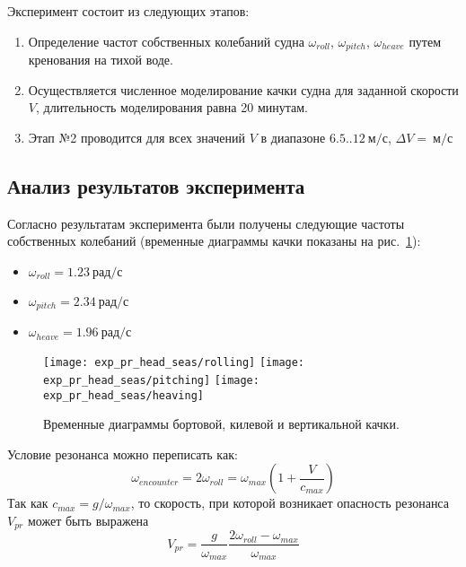Эксперимент состоит из следующих этапов:
\begin{enumerate}
	\item	Определение частот собственных колебаний судна 
			$\omega_{roll}$, $\omega_{pitch}$, $\omega_{heave}$ путем кренования на тихой воде.
	\item	Осуществляется численное моделирование качки судна для заданной скорости $V$, длительность моделирования равна 20 минутам.
	\item	Этап №2	проводится для всех значений $V$ в диапазоне 
			$6.5..12\ \text{м/с}$, $\Delta V=\ \text{м/с}$ 
\end{enumerate}

\subsection{Анализ результатов эксперимента}

Согласно результатам эксперимента были получены следующие частоты собственных колебаний (временные диаграммы качки показаны на рис.~\ref{exp_pr2_rolling}):
\begin{itemize}
	\item	$ \omega_{roll} = 1.23 \ \text{рад/с}$
	\item	$ \omega_{pitch} = 2.34 \ \text{рад/с}$
	\item	$ \omega_{heave} = 1.96 \ \text{рад/с}$
\end{itemize}

\begin{figure}[ht]
	\begin{center}
	\texttt{[image: exp\_pr\_head\_seas/rolling]}
	\texttt{[image: exp\_pr\_head\_seas/pitching]}
	\texttt{[image: exp\_pr\_head\_seas/heaving]}
	\end{center}
	\caption{Временные диаграммы бортовой, килевой и вертикальной качки.}
	\label{exp_pr2_rolling}
\end{figure}

Условие резонанса можно переписать как:
\begin{equation}
	\omega_{encounter} = 2 \omega_{roll} = \omega_{max} \left(  1 + \frac{V}{c_{max}}  \right)
\end{equation}
Так как $c_{max} = g / \omega_{max}$, то скорость, при которой возникает опасность резонанса $V_{pr}$ может быть выражена
\begin{equation}
	V_{pr} = \frac{g}{\omega_{max}} \frac{ 2 \omega_{roll} - \omega_{max} }{ \omega_{max}}
\end{equation}

